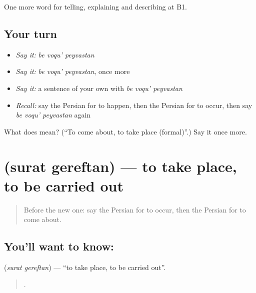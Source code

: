 \begin{grammarlens}[title={What you've built}]
One more word for telling, explaining and describing at B1.
\end{grammarlens}

\subsection*{Your turn}
\begin{itemize}
\raggedright
  \item \emph{Say it:} \emph{be voqu' peyvastan}
  \item \emph{Say it:} \emph{be voqu' peyvastan}, once more
  \item \emph{Say it:} a sentence of your own with \emph{be voqu' peyvastan}
  \item \emph{Recall:} say the Persian for to happen, then the Persian for to occur, then say \emph{be voqu' peyvastan} again
\end{itemize}

\begin{tcolorbox}[breakable,colback=teal!4,colframe=teal!35!black,title={Before you move on}]
What does    mean? (\textquotedblleft{}To come about, to take place (formal)\textquotedblright{}.) Say it once more.
\end{tcolorbox}
\section[\texorpdfstring{\fa{صورت} \fa{گرفتن} (surat gereftan)}{صورت گرفتن (surat gereftan)}]{  (surat gereftan) — to take place, to be carried out}

\label{lesson:FA-C301-surat-gereftan}



\begin{quote}
Before the new one: say the Persian for to occur, then the Persian for to come about.
\end{quote}

\subsection*{You'll want to know:  }
\textbf{ } (\emph{surat gereftan}) — \textquotedblleft{}to take place, to be carried out\textquotedblright{}.

\begin{quote}
    .
\end{quote}

